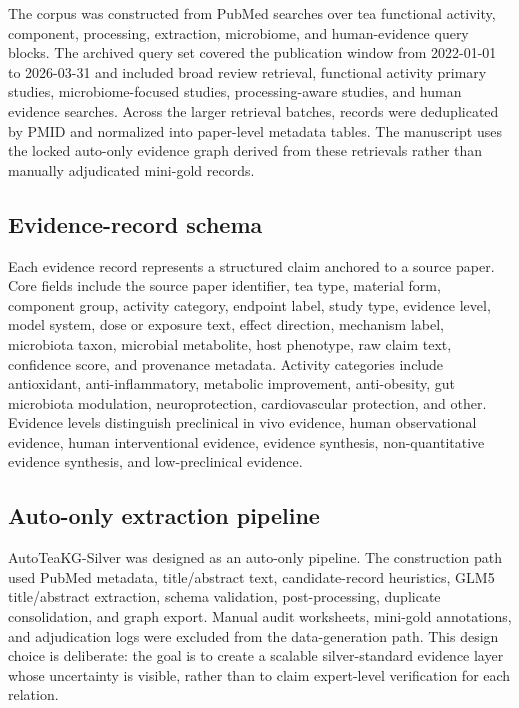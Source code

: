 \documentclass[11pt]{article}
\begin{document}
The corpus was constructed from PubMed searches over tea functional activity, component, processing, extraction, microbiome, and human-evidence query blocks. The archived query set covered the publication window from 2022-01-01 to 2026-03-31 and included broad review retrieval, functional activity primary studies, microbiome-focused studies, processing-aware studies, and human evidence searches. Across the larger retrieval batches, records were deduplicated by PMID and normalized into paper-level metadata tables. The manuscript uses the locked auto-only evidence graph derived from these retrievals rather than manually adjudicated mini-gold records.

\subsection{Evidence-record schema}

Each evidence record represents a structured claim anchored to a source paper. Core fields include the source paper identifier, tea type, material form, component group, activity category, endpoint label, study type, evidence level, model system, dose or exposure text, effect direction, mechanism label, microbiota taxon, microbial metabolite, host phenotype, raw claim text, confidence score, and provenance metadata. Activity categories include antioxidant, anti-inflammatory, metabolic improvement, anti-obesity, gut microbiota modulation, neuroprotection, cardiovascular protection, and other. Evidence levels distinguish preclinical in vivo evidence, human observational evidence, human interventional evidence, evidence synthesis, non-quantitative evidence synthesis, and low-preclinical evidence.

\subsection{Auto-only extraction pipeline}

AutoTeaKG-Silver was designed as an auto-only pipeline. The construction path used PubMed metadata, title/abstract text, candidate-record heuristics, GLM5 title/abstract extraction, schema validation, post-processing, duplicate consolidation, and graph export. Manual audit worksheets, mini-gold annotations, and adjudication logs were excluded from the data-generation path. This design choice is deliberate: the goal is to create a scalable silver-standard evidence layer whose uncertainty is visible, rather than to claim expert-level verification for each relation.
\end{document}
